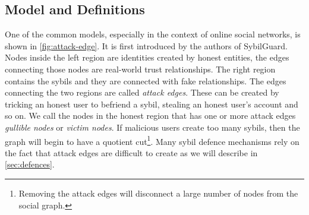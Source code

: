 
\subsection{Model and Definitions}
One of the common models, especially in the context of online social networks,
is shown in \autoref{fig:attack-edge}. It is first introduced by the authors of
SybilGuard\cite{yu2006sybilguard}. Nodes inside the left region are identities
created by honest entities, the edges connecting those nodes are real-world
trust relationships. The right region contains the sybils and they are connected
with fake relationships. The edges connecting the two regions are called
\emph{attack edges}. These can be created by tricking an honest user to befriend
a sybil, stealing an honest user's account and so on. We call the nodes in the
honest region that has one or more attack edges \emph{gullible nodes} or
\emph{victim nodes}. If malicious users create too many sybils, then the graph
will begin to have a quotient cut\footnote{Removing the attack edges will
  disconnect a large number of nodes from the social graph.}. Many sybil defence
mechanisms rely on the fact that attack edges are difficult to create as we will
describe in \autoref{sec:defences}.

